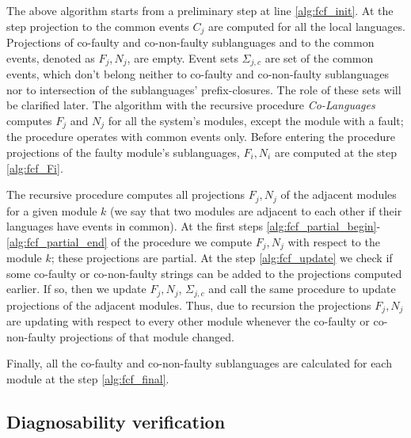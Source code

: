 \documentclass[a4paper, 10pt, conference]{ieeeconf}
\begin{document}
The above algorithm starts from a preliminary step at line \ref{alg:fcf_init}.
At the step projection to the common events $C_j$ are computed for all the local
languages. Projections of co-faulty and co-non-faulty sublanguages and
to the common events, denoted as $F_j, N_j$, are empty. Event sets
$\Sigma_{j,c}$ are set of the common events, which don't belong neither to co-faulty and
co-non-faulty sublanguages nor to intersection of the sublanguages'
prefix-closures. The role of these sets will be clarified later.
The algorithm with the recursive procedure \emph{Co-Languages} computes $F_j$
and $N_j$ for all the system's modules, except the module with a fault; the
procedure operates with common events only. Before entering the procedure 
projections of the faulty module's sublanguages, $F_i, N_i$ are computed at the
step \ref{alg:fcf_Fi}.

The recursive procedure computes all projections $F_j, N_j$ of the adjacent
modules for a given module $k$ (we say that two modules are adjacent to each
other if their languages have events in common). At the first steps
\ref{alg:fcf_partial_begin}-\ref{alg:fcf_partial_end} of the
procedure we compute $F_j, N_j$ with respect to the module $k$; these
projections are partial. At the step \ref{alg:fcf_update} we check if some
co-faulty or co-non-faulty strings can be added to the projections computed
earlier. If so, then we update $F_j, N_j$, $\Sigma_{j,c}$ and call the same
procedure to update projections of the adjacent modules. Thus, due to recursion
the projections $F_j, N_j$ are updating with respect to every other module
whenever the co-faulty or co-non-faulty projections of that module changed.

Finally, all the co-faulty and co-non-faulty sublanguages are calculated
for each module at the step \ref{alg:fcf_final}.




\subsection{Diagnosability verification}
\end{document}
